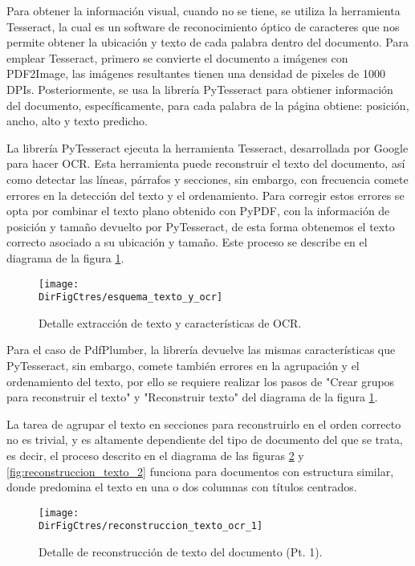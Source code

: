 Para obtener la información visual, cuando no se tiene, se utiliza la herramienta
Tesseract, la cual es un software de reconocimiento óptico de caracteres que
nos permite obtener la ubicación y texto de cada palabra dentro del documento.
Para emplear Tesseract, primero se convierte el documento a imágenes con
PDF2Image, las imágenes resultantes tienen una densidad de pixeles de 1000 DPIs.
Posteriormente, se usa la librería PyTesseract para obtiener información del
documento, específicamente, para cada palabra de la página obtiene: posición,
ancho, alto y texto predicho.

La librería PyTesseract ejecuta la herramienta Tesseract, desarrollada por
Google para hacer OCR. Esta herramienta puede reconstruir el texto del documento,
así como detectar las líneas, párrafos y secciones, sin embargo, con frecuencia
comete errores en la detección del texto y el ordenamiento. Para corregir
estos errores se opta por combinar el texto plano obtenido con PyPDF, con
la información de posición y tamaño devuelto por PyTesseract, de esta forma
obtenemos el texto correcto asociado a su ubicación y tamaño. Este proceso
se describe en el diagrama de la figura \ref{fig:texto_y_ocr}.

\begin{figure}[]
    \centering
    \texttt{[image: \\DirFigCtres/esquema\_texto\_y\_ocr]}
    \caption{Detalle extracción de texto y características de OCR.}
    \label{fig:texto_y_ocr}
\end{figure}

Para el caso de PdfPlumber, la librería devuelve las mismas características que
PyTesseract, sin embargo, comete también errores en la agrupación y el
ordenamiento del texto, por ello se requiere realizar los pasos de "Crear
grupos para reconstruir el texto" y "Reconstruir texto" del diagrama de la figura
\ref{fig:texto_y_ocr}.

La tarea de agrupar el texto en secciones para reconstruirlo en el orden correcto
no es trivial, y es altamente dependiente del tipo de documento del
que se trata, es decir, el proceso descrito en el diagrama de las figuras
\ref{fig:reconstruccion_texto_1} y \ref{fig:reconstruccion_texto_2} funciona para
documentos con estructura similar, donde predomina el texto en una o dos
columnas con títulos centrados.

\begin{figure}[]
    \centering
    \texttt{[image: \\DirFigCtres/reconstruccion\_texto\_ocr\_1]}
    \caption{Detalle de reconstrucción de texto del documento (Pt. 1).}
    \label{fig:reconstruccion_texto_1}
\end{figure}

